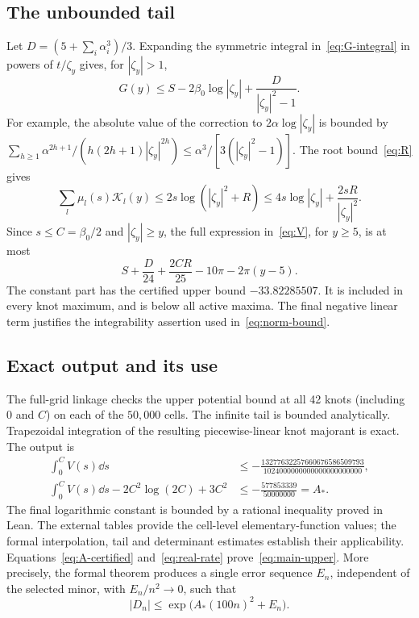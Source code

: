 \subsection{The unbounded tail}
Let $D=(5+\sum_i\alpha_i^3)/3$.  Expanding the symmetric integral
in~\eqref{eq:G-integral} in powers of $t/\zeta_y$ gives, for
$|\zeta_y|>1$,
\begin{equation}\label{eq:G-tail}
 G(y)\le S-2\beta_0\log|\zeta_y|
                         +\frac{D}{|\zeta_y|^2-1}.
\end{equation}
For example, the absolute value of the correction to
$2\alpha\log|\zeta_y|$ is bounded by
$\sum_{h\ge1}\alpha^{2h+1}/(h(2h+1)|\zeta_y|^{2h})
\le\alpha^3/[3(|\zeta_y|^2-1)]$.
The root bound~\eqref{eq:R} gives
\[
 \sum_l\mu_l(s)\mathcal K_l(y)
 \le2s\log(|\zeta_y|^2+R)
 \le4s\log|\zeta_y|+\frac{2sR}{|\zeta_y|^2}.
\]
Since $s\le C=\beta_0/2$ and $|\zeta_y|\ge y$, the full expression
in~\eqref{eq:V}, for $y\ge5$, is at most
\begin{equation}\label{eq:tail-constant}
 S+\frac D{24}+\frac{2CR}{25}-10\pi-2\pi(y-5).
\end{equation}
The constant part has the certified upper bound $-33.82285507$.
It is included in every knot maximum, and is below all active maxima.
The final negative linear term justifies the integrability assertion
used in~\eqref{eq:norm-bound}.

\subsection{Exact output and its use}
The full-grid linkage checks the upper potential bound at all 42 knots
(including $0$ and $C$) on each of the $50{,}000$ cells. The infinite tail
is bounded analytically. Trapezoidal integration of the resulting
piecewise-linear knot majorant is exact. The output is
\begin{align}
 \int_0^C V(s)\dd s
 &\le-\frac{13277632257660676586509793}
                 {1024000000000000000000000},\label{eq:V-integral}\\
 \int_0^CV(s)\dd s-2C^2\log(2C)+3C^2
 &\le-\frac{577853339}{50000000}=A_*.
 \label{eq:A-certified}
\end{align}
The final logarithmic constant is bounded by a rational inequality proved
in Lean. The external tables provide the cell-level elementary-function
values; the formal interpolation, tail and determinant estimates establish
their applicability. Equations~\eqref{eq:A-certified} and~\eqref{eq:real-rate}
prove~\eqref{eq:main-upper}. More precisely, the formal theorem produces a
single error sequence $E_n$, independent of the selected minor, with
$E_n/n^2\to0$, such that
\begin{equation}\label{eq:uniform-upper}
 |D_n|\le\exp\bigl(A_*(100n)^2+E_n\bigr).
\end{equation}
